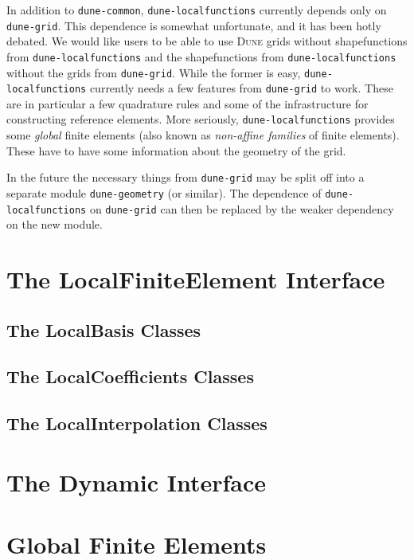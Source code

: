 \documentclass[a4paper,11pt]{article}
\newcommand{\dune}{\textsc{Dune}\xspace}
\newcommand{\modulename}[1]{\texttt{#1}\xspace}
\begin{document}
In addition to \modulename{dune-common}, \modulename{dune-localfunctions} currently
depends only on \modulename{dune-grid}.  This dependence is somewhat unfortunate,
and it has been hotly debated.  We would like users to be able to use \dune grids
without shapefunctions from \modulename{dune-localfunctions} and the shapefunctions
from \modulename{dune-localfunctions} without the grids from \modulename{dune-grid}.
While the former is easy, \modulename{dune-localfunctions} currently needs a few
features from \modulename{dune-grid} to work.  These are in particular a few
quadrature rules and some of the infrastructure for constructing reference elements.
More seriously, \modulename{dune-localfunctions} provides some {\em global} finite
elements (also known as {\em non-affine families} of finite elements).  These
have to have some information about the geometry of the grid.

In the future the necessary things from \modulename{dune-grid} may be split off
into a separate module \modulename{dune-geometry} (or similar).  The dependence of
\modulename{dune-localfunctions} on \modulename{dune-grid} can then be replaced
by the weaker dependency on the new module.


\section{The LocalFiniteElement Interface}
\label{sec:static_interface}

\subsection{The LocalBasis Classes}

\subsection{The LocalCoefficients Classes}

\subsection{The LocalInterpolation Classes}


\section{The Dynamic Interface}
\label{sec:dynamic_interface}

\section{Global Finite Elements}
\end{document}
